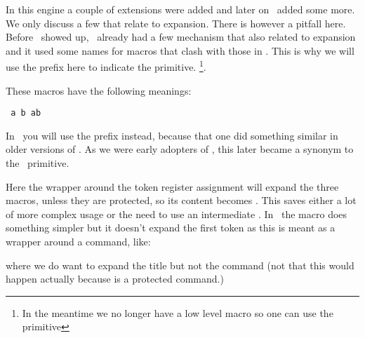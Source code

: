 
\stopsection

\startsection[title={\ETEX\ primitives}]

In this engine a couple of extensions were added and later on \PDFTEX\ added some
more. We only discuss a few that relate to expansion. There is however a pitfall
here. Before \ETEX\ showed up, \CONTEXT\ already had a few mechanism that also
related to expansion and it used some names for macros that clash with those in
\ETEX. This is why we will use the \type {\normal} prefix here to indicate the
primitive. \footnote {In the meantime we no longer have a low level \type
{\protected} macro so one can use the primitive}.

\startbuffer
\def\MyMacroA{a}
\def\MyMacroB{b}
\normalprotected{}
\edef\MyMacroABC{\MyMacroA\MyMacroB\MyMacroC}
\stopbuffer

\typebuffer[option=TEX] \getbuffer

These macros have the following meanings:

\startlines \tt
\meaning\MyMacroA
\meaning\MyMacroB
\meaning\MyMacroC
\meaning\MyMacroABC
\stoplines

In \CONTEXT\ you will use the \type {\unexpanded} prefix instead, because that one
did something similar in older versions of \CONTEXT. As we were early adopters of
\ETEX, this later became a synonym to the \ETEX\ primitive.

\startbuffer
\def\MyMacroA{a}
\def\MyMacroB{b}
\normalprotected{}
\normalexpanded{\scratchtoks{\MyMacroA\MyMacroB\MyMacroC}}
\stopbuffer

\typebuffer[option=TEX] \getbuffer

Here the wrapper around the token register assignment will expand the three
macros, unless they are protected, so its content becomes \MyShow. This saves
either a lot of more complex \type {\expandafter} usage or the need to use an intermediate
\type {\edef}. In \CONTEXT\ the \type {\expanded} macro does something simpler
but it doesn't expand the first token as this is meant as a wrapper around a command,
like:

\starttyping[option=TEX]
\stoptyping

where we do want to expand the title but not the \type {\chapter} command (not
that this would happen actually because \type {\chapter} is a protected command.)

